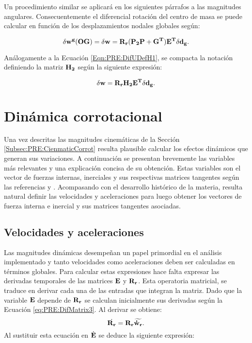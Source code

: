  Un procedimiento similar se aplicará en los siguientes párrafos a las magnitudes angulares. Consecuentemente el diferencial rotación del centro de masa se puede calcular en función de los desplazamientos nodales globales según:

 \begin{equation}\label{Eqn:PRE:AngularBaricentro}
 	\delta \bf{w^g} (OG) =\delta \bf{w} =\bf{R}_r (\bf{P}_2\bf{P}+\bf{G}^T)\bf{E}^T\delta \bf{d}_g .
 \end{equation}

Análogamente a la Ecuación \eqref{Eqn:PRE:DifUDefH1}, se compacta la notación definiendo la matriz $\bf{H}_2$ según la siguiente expresión:

\begin{equation}
	\delta \bf{w}= \bf{R}_r\bf{H}_2\bf{E}^T \delta \bf{d}_g.
\end{equation}




\section{Dinámica corrotacional}\label{Subsec:PRE:DinamicCorrot}

Una vez descritas las magnitudes cinemáticas de la Sección \ref{Subsec:PRE:CienmaticCorrot} resulta plausible calcular los efectos dinámicos que generan sus variaciones. A continuación se presentan brevemente las variables más relevantes y una explicación concisa de su obtención. Estas
variables son el vector de fuerzas internas, inerciales y sus respectivas matrices tangentes según las referencias  \citep{Le2014} y \citep{Battini2002}. Acompasando con el desarrollo histórico de la materia, resulta natural definir las velocidades y aceleraciones para luego obtener los vectores de fuerza interna e inercial y sus matrices tangentes asociadas. 

\subsection{Velocidades y aceleraciones}\label{Sec:PRE:VelAc}

Las magnitudes dinámicas desempeñan un papel primordial en el análisis implementado y tanto velocidades como aceleraciones deben ser calculadas en términos globales. Para calcular estas expresiones hace falta expresar las derivadas temporales de las matrices $\bf{E}$ y $\bf{R}_r$. Esta operatoria matricial, se traduce en derivar cada una de las entradas que integran la matriz. Dado que la variable $\bf{E}$ depende de $\bf{R}_r$ se calculan inicialmente sus derivadas según la Ecuación \eqref{eq:PRE:DifMatrix3}. Al derivar se obtiene: 
\begin{equation}
\dot{\bf{R}_r} = \bf{R_r}\widetilde{\dot{\bf{w}}_r}.
\end{equation}
 Al sustituir esta ecuación en $\dot{\bf{E}}$ se deduce la siguiente expresión:

